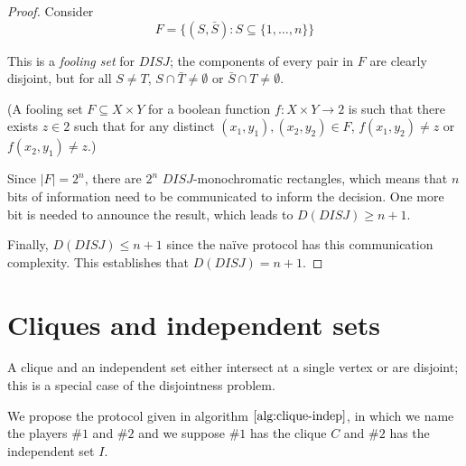 \documentclass[letterpaper,11pt]{article}
\begin{document}
\begin{proof}
    Consider
    \begin{equation*}
        F = \{(S, \bar S) : S \subseteq \{1, \ldots, n\}\}
    \end{equation*}

    This is a \emph{fooling set} for $DISJ$; the components of every pair in
    $F$ are clearly disjoint, but for all $S \neq T$, $S \cap \bar T \neq
    \emptyset$ or $\bar S \cap T \neq \emptyset$.

    (A fooling set $F \subseteq X \times Y$ for a boolean function
    $f : X \times Y \to 2$ is such that there exists $z \in 2$ such that for
    any distinct $(x_1, y_1), (x_2, y_2) \in F$, $f(x_1, y_2) \neq z$ or
    $f(x_2, y_1) \neq z$.)

    Since $|F| = 2^n$, there are $2^n$ $DISJ$-monochromatic rectangles, which
    means that $n$ bits of information need to be communicated to inform the
    decision. One more bit is needed to announce the result, which leads to
    $D(DISJ) \geq n+1$.

    Finally, $D(DISJ) \leq n+1$ since the na\"ive protocol has this
    communication complexity. This establishes that $D(DISJ) = n + 1$.
\end{proof}

\section{Cliques and independent sets}

A clique and an independent set either intersect at a single vertex or are
disjoint; this is a special case of the disjointness problem.

We propose the protocol given in algorithm $\ref{alg:clique-indep}$, in which
we name the players $\#1$ and $\#2$ and we suppose $\#1$ has the clique $C$ and
$\#2$ has the independent set $I$.
\end{document}
